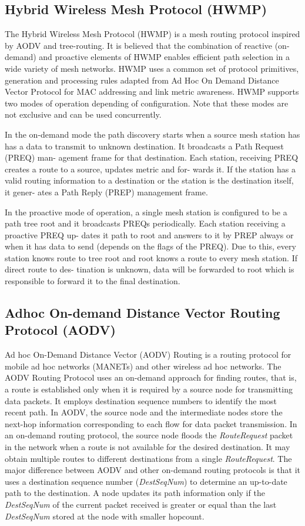 \documentclass[12pt,a4paper]{report}
\begin{document}
\subsection{Hybrid Wireless Mesh Protocol (HWMP) }
The Hybrid Wireless Mesh Protocol (HWMP) is a mesh
routing protocol inspired by AODV and tree-routing. It is
believed that the combination of reactive (on-demand) and
proactive elements of HWMP enables efficient path selection
in a wide variety of mesh networks. HWMP uses a common
set of protocol primitives, generation and processing rules
adapted from Ad Hoc On Demand Distance Vector Protocol for MAC addressing and link metric awareness. HWMP
supports two modes of operation depending of configuration.
Note that these modes are not exclusive and can be used
concurrently.

In the on-demand mode the path discovery starts when a
source mesh station has has a data to transmit to unknown
destination. It broadcasts a Path Request (PREQ) man-
agement frame for that destination. Each station, receiving
PREQ creates a route to a source, updates metric and for-
wards it. If the station has a valid routing information to a
destination or the station is the destination itself, it gener-
ates a Path Reply (PREP) management frame.

In the proactive mode of operation, a single mesh station is
configured to be a path tree root and it broadcasts PREQs
periodically. Each station receiving a proactive PREQ up-
dates it path to root and answers to it by PREP always or
when it has data to send (depends on the flags of the PREQ).
Due to this, every station knows route to tree root and root
knows a route to every mesh station. If direct route to des-
tination is unknown, data will be forwarded to root which
is responsible to forward it to the final destination.

\subsection{Adhoc On-demand Distance Vector Routing Protocol (AODV)}
Ad hoc On-Demand Distance Vector (AODV) Routing is a routing protocol for mobile ad hoc networks (MANETs) and other wireless ad hoc networks. The AODV Routing Protocol uses an on-demand approach for finding routes, that is, a route is established only when it is required by a source node for transmitting data packets. It employs destination sequence numbers to identify the most recent path.  In AODV, the source node and the intermediate nodes store the next-hop information corresponding to each flow for data packet transmission. In an on-demand routing protocol, the source node floods the \textit{RouteRequest} packet in the network when a route is not available for the desired destination. It may obtain multiple routes to different destinations from a single \textit{RouteRequest}. The major difference between AODV and other on-demand routing protocols is that it uses a destination sequence number (\textit{DestSeqNum}) to determine an up-to-date path to the destination. A node updates its path information only if the \textit{DestSeqNum} of the current packet received is greater or equal than the last \textit{DestSeqNum} stored at the node with smaller hopcount.
\end{document}
